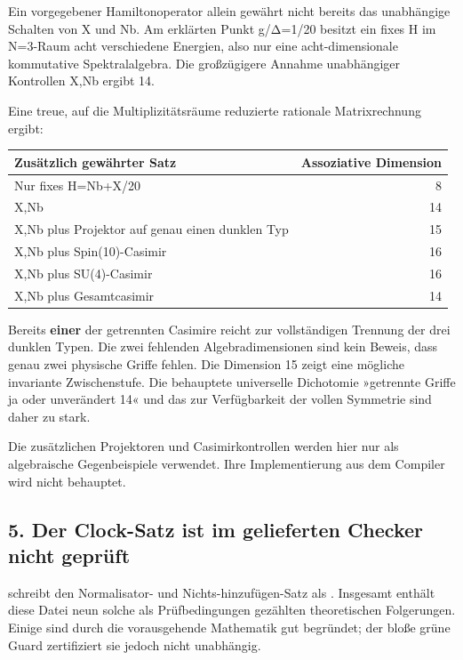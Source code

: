 Ein vorgegebener Hamiltonoperator allein gewährt nicht bereits das
unabhängige Schalten von X und Nb. Am erklärten Punkt g/Δ=1/20 besitzt
ein fixes H im N=3-Raum acht verschiedene Energien, also nur eine
acht-dimensionale kommutative Spektralalgebra. Die großzügigere Annahme
unabhängiger Kontrollen X,Nb ergibt 14.

Eine treue, auf die Multiplizitätsräume reduzierte rationale
Matrixrechnung ergibt:

{\def\LTcaptype{none} %
\begin{longtable}[]{@{}lr@{}}
\toprule\noalign{}
Zusätzlich gewährter Satz & Assoziative Dimension \\
\midrule\noalign{}
\endhead
\bottomrule\noalign{}
\endlastfoot
Nur fixes H=Nb+X/20 & 8 \\
X,Nb & 14 \\
X,Nb plus Projektor auf genau einen dunklen Typ & 15 \\
X,Nb plus Spin(10)-Casimir & 16 \\
X,Nb plus SU(4)-Casimir & 16 \\
X,Nb plus Gesamtcasimir & 14 \\
\end{longtable}
}

Bereits \textbf{einer} der getrennten Casimire reicht zur vollständigen
Trennung der drei dunklen Typen. Die zwei fehlenden Algebradimensionen
sind kein Beweis, dass genau zwei physische Griffe fehlen. Die Dimension
15 zeigt eine mögliche invariante Zwischenstufe. Die behauptete
universelle Dichotomie »getrennte Griffe ja oder unverändert 14« und das
 zur Verfügbarkeit der vollen Symmetrie sind
daher zu stark.

Die zusätzlichen Projektoren und Casimirkontrollen werden hier nur als
algebraische Gegenbeispiele verwendet. Ihre Implementierung aus dem
Compiler wird nicht behauptet.

\subsection{5. Der Clock-Satz ist im gelieferten Checker nicht
geprüft}\label{der-clock-satz-ist-im-gelieferten-checker-nicht-gepruxfcft}

 schreibt den Normalisator- und
Nichts-hinzufügen-Satz als . Insgesamt enthält
diese Datei neun solche als Prüfbedingungen gezählten theoretischen
Folgerungen. Einige sind durch die vorausgehende Mathematik gut
begründet; der bloße grüne Guard zertifiziert sie jedoch nicht
unabhängig.

